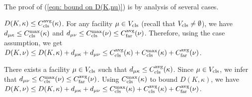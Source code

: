 \documentclass[oneside,final]{ucr}
\begin{document}
\medskip

The proof of (\ref{eqn: bound on D(K,nu)}) is by analysis of several cases.
%

\medskip
\noindent
{} $D(K, \kappa) \leq \clsdist(\kappa)$. For any
facility $\mu \in V_{\cls}$ (recall that $V_{\cls}\neq\emptyset$), 
we have $d_{\mu\kappa} \leq \clsmax(\kappa)$ 
and $d_{\mu\nu} \leq \clsmax(\nu) \leq \fardist(\nu)$. Therefore, using the
case assumption, we get
	$D(K,\nu) \leq D(K,\kappa) + d_{\mu\kappa} + d_{\mu\nu} 
				\leq \clsdist(\kappa) + \clsmax(\kappa) + \fardist(\nu)$.

\medskip
\noindent
{} There exists a facility $\mu\in V_{\cls}$ such that
  $d_{\mu\kappa} \leq \clsdist(\kappa)$. Since $\mu\in V_{\cls}$, we infer
  that $d_{\mu\nu} \leq \clsmax(\nu) \leq \fardist(\nu)$.  Using
  $\clsmax(\kappa)$ to bound $D(K, \kappa)$, we have $D(K, \nu)
  \leq D(K, \kappa) + d_{\mu\kappa} + d_{\mu\nu} \leq
  \clsmax(\kappa) + \clsdist(\kappa) + \fardist(\nu)$.
\end{document}
